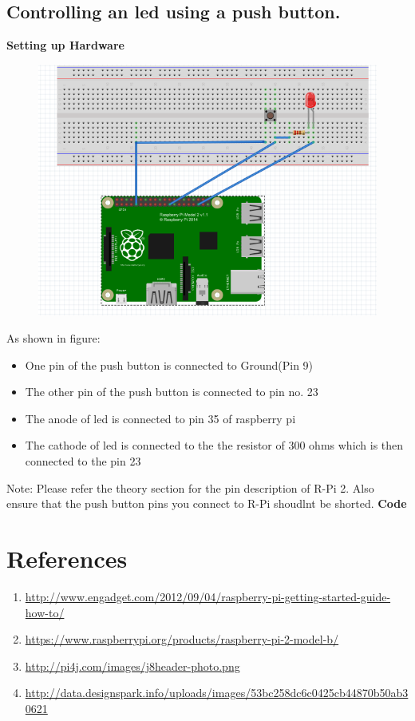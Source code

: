 \documentclass[11pt,a4paper]{article}
\begin{document}
	 \subsection{ Controlling an led using a push button.}
	 \textbf{Setting up Hardware}		
		\begin{figure}[h!]
			\includegraphics[scale=0.4]{GPIO.png}
			\centering
		\end{figure}
		As shown in figure:
		\begin{itemize}
			\item One pin of the push button is connected to Ground(Pin 9)
			\item The other pin of the push button is connected to pin no. 23
			\item The anode of led is connected to pin 35 of raspberry pi
			\item The cathode of led is connected to the the resistor of 300 ohms which is then connected to the pin 23
		\end{itemize}
		Note: Please refer the theory section for the pin description of R-Pi 2. Also ensure that the push button pins you connect to R-Pi shoudlnt be shorted.
		\vspace{0.3cm}
		\newline
		\textbf{Code}
		
		
	\section{References}
	\begin{enumerate}
		\item \url{http://www.engadget.com/2012/09/04/raspberry-pi-getting-started-guide-how-to/}
		\item \url{https://www.raspberrypi.org/products/raspberry-pi-2-model-b/}
		\item \url{http://pi4j.com/images/j8header-photo.png}
		\item \url{http://data.designspark.info/uploads/images/53bc258dc6c0425cb44870b50ab30621}
	\end{enumerate}
	
	
\end{document}
